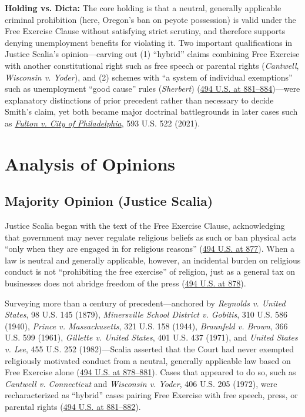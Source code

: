 \documentclass[12pt]{article}
\begin{document}
\textbf{Holding vs. Dicta:} The core holding is that a neutral, generally applicable criminal prohibition (here, Oregon's ban on peyote possession) is valid under the Free Exercise Clause without satisfying strict scrutiny, and therefore supports denying unemployment benefits for violating it. Two important qualifications in Justice Scalia's opinion---carving out (1) ``hybrid'' claims combining Free Exercise with another constitutional right such as free speech or parental rights (\textit{Cantwell}, \textit{Wisconsin v. Yoder}), and (2) schemes with ``a system of individual exemptions'' such as unemployment ``good cause'' rules (\textit{Sherbert}) (\href{https://supreme.justia.com/cases/federal/us/494/872/}{494 U.S. at 881--884})---were explanatory distinctions of prior precedent rather than necessary to decide Smith's claim, yet both became major doctrinal battlegrounds in later cases such as \href{https://www.oyez.org/cases/2020/19-123}{\textit{Fulton v. City of Philadelphia}}, 593 U.S. 522 (2021).

\section{Analysis of Opinions}

\subsection{Majority Opinion (Justice Scalia)}

Justice Scalia began with the text of the Free Exercise Clause, acknowledging that government may never regulate religious beliefs as such or ban physical acts ``only when they are engaged in for religious reasons'' (\href{https://supreme.justia.com/cases/federal/us/494/872/}{494 U.S. at 877}). When a law is neutral and generally applicable, however, an incidental burden on religious conduct is not ``prohibiting the free exercise'' of religion, just as a general tax on businesses does not abridge freedom of the press (\href{https://supreme.justia.com/cases/federal/us/494/872/}{494 U.S. at 878}).

Surveying more than a century of precedent---anchored by \textit{Reynolds v. United States}, 98 U.S. 145 (1879), \textit{Minersville School District v. Gobitis}, 310 U.S. 586 (1940), \textit{Prince v. Massachusetts}, 321 U.S. 158 (1944), \textit{Braunfeld v. Brown}, 366 U.S. 599 (1961), \textit{Gillette v. United States}, 401 U.S. 437 (1971), and \textit{United States v. Lee}, 455 U.S. 252 (1982)---Scalia asserted that the Court had never exempted religiously motivated conduct from a neutral, generally applicable law based on Free Exercise alone (\href{https://supreme.justia.com/cases/federal/us/494/872/}{494 U.S. at 878--881}). Cases that appeared to do so, such as \textit{Cantwell v. Connecticut} and \textit{Wisconsin v. Yoder}, 406 U.S. 205 (1972), were recharacterized as ``hybrid'' cases pairing Free Exercise with free speech, press, or parental rights (\href{https://supreme.justia.com/cases/federal/us/494/872/}{494 U.S. at 881--882}).
\end{document}
